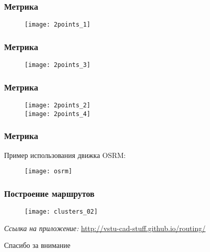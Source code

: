 \begin{frame}
    \frametitle{Метрика}
    \begin{figure}
        \center
        \texttt{[image: 2points\_1]}
    \end{figure}
\end{frame}

\begin{frame}
    \frametitle{Метрика}
    \begin{figure}
        \center
        \texttt{[image: 2points\_3]}
    \end{figure}
\end{frame}

\begin{frame}
    \frametitle{Метрика}
    \vspace{-1ex}
    \begin{figure}
        \center
        \texttt{[image: 2points\_2]} \\
        \texttt{[image: 2points\_4]}
    \end{figure}
\end{frame}

\begin{frame}
    \frametitle{Метрика}
    Пример использования движка OSRM:
    \begin{figure}
        \center
        \texttt{[image: osrm]}
    \end{figure}
\end{frame}

\begin{frame}
    \frametitle{Построение маршрутов}
    \begin{figure}
        \center
        \texttt{[image: clusters\_02]}
    \end{figure}
    \small\emph{Ссылка на приложение:} \url{http://vstu-cad-stuff.github.io/routing/}
\end{frame}

\begin{frame}
    \vfill
    \begin{center}
        Спасибо за внимание
    \end{center}
    \vfill
\end{frame}
